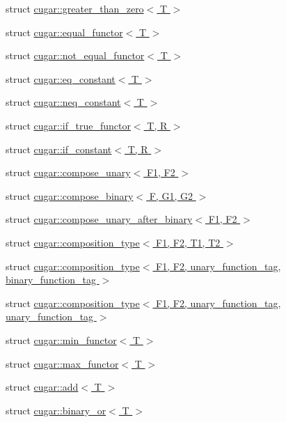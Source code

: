 \begin{DoxyCompactItemize}
\item 
struct \hyperlink{structcugar_1_1greater__than__zero}{cugar\+::greater\+\_\+than\+\_\+zero$<$ T $>$}
\item 
struct \hyperlink{structcugar_1_1equal__functor}{cugar\+::equal\+\_\+functor$<$ T $>$}
\item 
struct \hyperlink{structcugar_1_1not__equal__functor}{cugar\+::not\+\_\+equal\+\_\+functor$<$ T $>$}
\item 
struct \hyperlink{structcugar_1_1eq__constant}{cugar\+::eq\+\_\+constant$<$ T $>$}
\item 
struct \hyperlink{structcugar_1_1neq__constant}{cugar\+::neq\+\_\+constant$<$ T $>$}
\item 
struct \hyperlink{structcugar_1_1if__true__functor}{cugar\+::if\+\_\+true\+\_\+functor$<$ T, R $>$}
\item 
struct \hyperlink{structcugar_1_1if__constant}{cugar\+::if\+\_\+constant$<$ T, R $>$}
\item 
struct \hyperlink{structcugar_1_1compose__unary}{cugar\+::compose\+\_\+unary$<$ F1, F2 $>$}
\item 
struct \hyperlink{structcugar_1_1compose__binary}{cugar\+::compose\+\_\+binary$<$ F, G1, G2 $>$}
\item 
struct \hyperlink{structcugar_1_1compose__unary__after__binary}{cugar\+::compose\+\_\+unary\+\_\+after\+\_\+binary$<$ F1, F2 $>$}
\item 
struct \hyperlink{structcugar_1_1composition__type}{cugar\+::composition\+\_\+type$<$ F1, F2, T1, T2 $>$}
\item 
struct \hyperlink{structcugar_1_1composition__type_3_01_f1_00_01_f2_00_01unary__function__tag_00_01binary__function__tag_01_4}{cugar\+::composition\+\_\+type$<$ F1, F2, unary\+\_\+function\+\_\+tag, binary\+\_\+function\+\_\+tag $>$}
\item 
struct \hyperlink{structcugar_1_1composition__type_3_01_f1_00_01_f2_00_01unary__function__tag_00_01unary__function__tag_01_4}{cugar\+::composition\+\_\+type$<$ F1, F2, unary\+\_\+function\+\_\+tag, unary\+\_\+function\+\_\+tag $>$}
\item 
struct \hyperlink{structcugar_1_1min__functor}{cugar\+::min\+\_\+functor$<$ T $>$}
\item 
struct \hyperlink{structcugar_1_1max__functor}{cugar\+::max\+\_\+functor$<$ T $>$}
\item 
struct \hyperlink{structcugar_1_1add}{cugar\+::add$<$ T $>$}
\item 
struct \hyperlink{structcugar_1_1binary__or}{cugar\+::binary\+\_\+or$<$ T $>$}

\end{DoxyCompactItemize}
